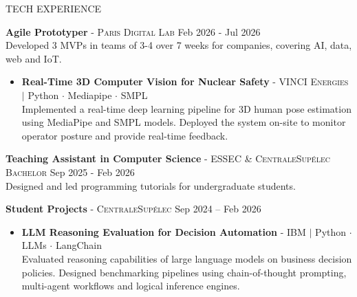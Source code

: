 \documentclass{resume}
\newcommand{\dateentry}[1]{\hfill{\small #1}}
\newcommand{\skill}[1]{\textcolor{navycustom}{#1}}
\begin{document}
\begin{rSection}{TECH EXPERIENCE}\vspace{-0.3em}

{\bf Agile Prototyper} \textsc{- Paris Digital Lab} \dateentry{ Feb 2026 - Jul 2026} \\
Developed 3 MVPs in teams of 3-4 over 7 weeks for companies, covering AI, data, web and IoT.

\vspace{-0.7em} 
\begin{itemize}[label=\scriptsize$\bullet$, left=0.5em, itemsep=0.3em]

    \item \textbf{Real-Time 3D Computer Vision for Nuclear Safety} \textsc{- VINCI Energies} $\mid$ 
    \skill{Python} $\cdot$ 
    \skill{Mediapipe} $\cdot$ 
    \skill{SMPL} \\
    Implemented a real-time deep learning pipeline for 3D human pose estimation using MediaPipe and SMPL models.
Deployed the system on-site to monitor operator posture and provide real-time feedback.

\end{itemize}
\vspace{-0.4em} 

{\bf Teaching Assistant in Computer Science} \textsc{- ESSEC \& CentraleSupélec Bachelor} \dateentry{Sep 2025 - Feb 2026} \\
Designed and led programming tutorials for undergraduate students.
    
\vspace{-0.4em} 
{\bf Student Projects} \textsc{- CentraleSupélec} \dateentry{Sep 2024 -- Feb 2026}
\vspace{-0.4em} 
\begin{itemize}[label=\scriptsize$\bullet$]

    
    \item \textbf{LLM Reasoning Evaluation for Decision Automation} \textsc{- IBM} $\mid$ 
    \skill{Python} $\cdot$ 
    \skill{LLMs} $\cdot$  
    \skill{LangChain} \\
   Evaluated reasoning capabilities of large language models on business decision policies.
Designed benchmarking pipelines using chain-of-thought prompting, multi-agent workflows and logical inference engines.


\end{itemize}
\end{rSection}
\end{document}
